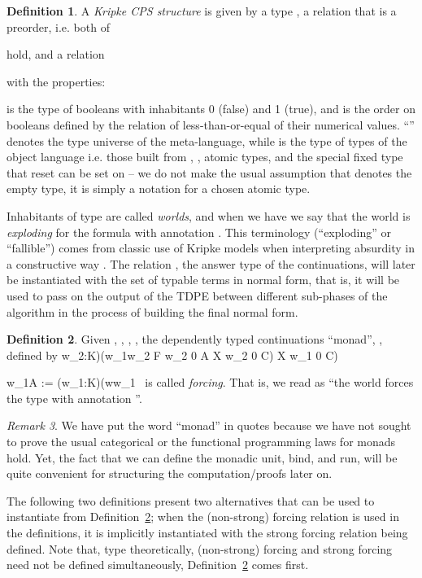 \documentclass{eptcs}
\newcommand{\forces}[3]{{#1}\Vdash_{#2}{#3}}
\theoremstyle{definition}
\newtheorem{definition}{Definition}[section]
\theoremstyle{plain}
\theoremstyle{remark}
\newtheorem{remark}[definition]{Remark}
\begin{document}
\begin{definition}A \emph{Kripke CPS structure} is given by a type , a relation  that is a preorder, i.e. both of

hold, and a relation

with the properties:


 is the type of booleans with inhabitants 0 (false) and 1 (true), and  is the order on booleans defined by the relation of less-than-or-equal of their numerical values. ``'' denotes the type universe of the meta-language, while  is the type of types of the object language i.e. those built from , , atomic types, and the special fixed type  that reset can be set on -- we do not make the usual assumption that  denotes the empty type, it is simply a notation for a chosen atomic type.

Inhabitants  of type  are called \emph{worlds}, and when we have  we say that the world  is \emph{exploding} for the formula  with annotation . This terminology (``exploding'' or ``fallible'') comes from classic use of Kripke models when interpreting absurdity in a constructive way \cite{TroelstraVD1}. The relation , the answer type of the continuations, will later be instantiated with the set of typable terms in normal form, that is, it will be used to pass on the output of the TDPE between different sub-phases of the algorithm in the process of building the final normal form.
\end{definition}

\begin{definition}\label{def:forcing}Given , , , , the dependently typed continuations ``monad'', , defined by
w_2:K)(w_1\le w_2 \to F w_2 0 A \to X w_2 0 C) \to X w_1 0 C)

\forces{w}{1}{A} := (w_1:K)(w\le w_1 \to \
is called \emph{forcing}. That is, we read  as ``the world  forces the type  with annotation ''. 
\end{definition}

\begin{remark}
  We have put the word ``monad'' in quotes because we have not sought to prove the usual categorical or the functional programming laws for monads hold. Yet, the fact that we can define the monadic unit, bind, and run, will be quite convenient for structuring the computation/proofs later on.
\end{remark}

The following two definitions present two alternatives that can be used to instantiate  from Definition~\ref{def:forcing}; when the (non-strong) forcing relation is used in the definitions, it is implicitly instantiated with the strong forcing relation being defined. Note that, type theoretically, (non-strong) forcing and strong forcing need not be defined simultaneously, Definition~\ref{def:forcing} comes first.
\end{document}
